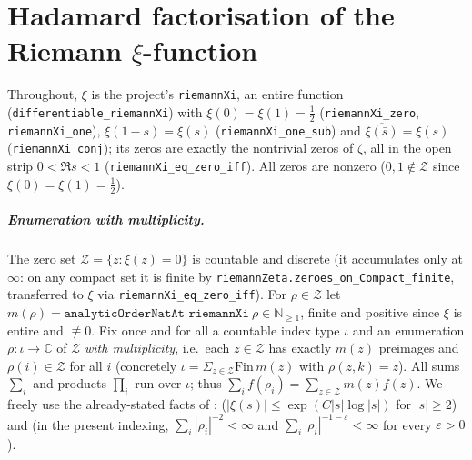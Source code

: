 %
%

\chapter{Hadamard factorisation of the Riemann \texorpdfstring{$\xi$}{xi}-function}
\label{cha:hadamard}

Throughout, $\xi$ is the project's \texttt{riemannXi}, an entire
function (\texttt{differentiable\_riemannXi}) with $\xi(0)=\xi(1)=\tfrac12$
(\texttt{riemannXi\_zero}, \texttt{riemannXi\_one}), $\xi(1-s)=\xi(s)$
(\texttt{riemannXi\_one\_sub}) and $\overline{\xi(\bar s)}=\xi(s)$
(\texttt{riemannXi\_conj}); its zeros are exactly the nontrivial zeros of $\zeta$,
all in the open strip $0<\Re s<1$ (\texttt{riemannXi\_eq\_zero\_iff}). All zeros are
nonzero ($0,1\notin\mathcal Z$ since $\xi(0)=\xi(1)=\tfrac12$).

\paragraph{Enumeration with multiplicity.} The zero set
$\mathcal Z=\{z:\xi(z)=0\}$ is countable and discrete (it accumulates only at
$\infty$: on any compact set it is finite by
\texttt{riemannZeta.zeroes\_on\_Compact\_finite}, transferred to $\xi$ via
\texttt{riemannXi\_eq\_zero\_iff}). For $\rho\in\mathcal Z$ let
$m(\rho)=\texttt{analyticOrderNatAt riemannXi}~\rho\in\mathbb N_{\ge1}$, finite and
positive since $\xi$ is entire and $\not\equiv0$. Fix once and for all a countable
index type $\iota$ and an enumeration $\rho:\iota\to\mathbb C$ of $\mathcal Z$ \emph{with
multiplicity}, i.e.\ each $z\in\mathcal Z$ has exactly $m(z)$ preimages and
$\rho(i)\in\mathcal Z$ for all $i$ (concretely $\iota=\Sigma_{z\in\mathcal Z}\mathrm{Fin}\,m(z)$
with $\rho(z,k)=z$). All sums $\sum_i$ and products $\prod_i$ run over $\iota$; thus
$\sum_i f(\rho_i)=\sum_{z\in\mathcal Z}m(z)f(z)$. We freely use the already-stated
facts of : 
($|\xi(s)|\le\exp(C|s|\log|s|)$ for $|s|\ge2$) and 
(in the present indexing, $\sum_i|\rho_i|^{-2}<\infty$ and
$\sum_i|\rho_i|^{-1-\varepsilon}<\infty$ for every $\varepsilon>0$).

